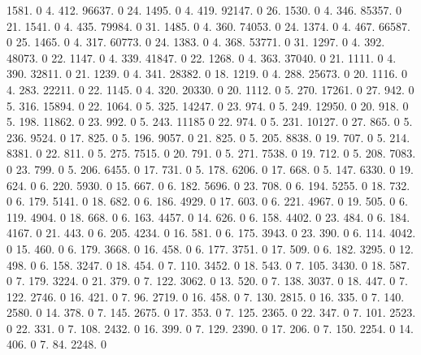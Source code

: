 1581. 0 4. 412. 96637. 0 24. 1495. 0 4. 419. 92147. 0 26. 1530. 0 4. 346. 85357. 0 21. 1541. 0 4. 435. 79984. 0 31. 1485. 0 4. 360. 74053. 0 24. 1374. 0 4. 467. 66587. 0 25. 1465. 0 4. 317. 60773. 0 24. 1383. 0 4. 368. 53771. 0 31. 1297. 0 4. 392. 48073. 0 22. 1147. 0 4. 339. 41847. 0 22. 1268. 0 4. 363. 37040. 0 21. 1111. 0 4. 390. 32811. 0 21. 1239. 0 4. 341. 28382. 0 18. 1219. 0 4. 288. 25673. 0 20. 1116. 0 4. 283. 22211. 0 22. 1145. 0 4. 320. 20330. 0 20. 1112. 0 5. 270. 17261. 0 27. 942. 0 5. 316. 15894. 0 22. 1064. 0 5. 325. 14247. 0 23. 974. 0 5. 249. 12950. 0 20. 918. 0 5. 198. 11862. 0 23. 992. 0 5. 243. 11185 0 22. 974. 0 5. 231. 10127. 0 27. 865. 0 5. 236. 9524. 0 17. 825. 0 5. 196. 9057. 0 21. 825. 0 5. 205. 8838. 0 19. 707. 0 5. 214. 8381. 0 22. 811. 0 5. 275. 7515. 0 20. 791. 0 5. 271. 7538. 0 19. 712. 0 5. 208. 7083. 0 23. 799. 0 5. 206. 6455. 0 17. 731. 0 5. 178. 6206. 0 17. 668. 0 5. 147. 6330. 0 19. 624. 0 6. 220. 5930. 0 15. 667. 0 6. 182. 5696. 0 23. 708. 0 6. 194. 5255. 0 18. 732. 0 6. 179. 5141. 0 18. 682. 0 6. 186. 4929. 0 17. 603. 0 6. 221. 4967. 0 19. 505. 0 6. 119. 4904. 0 18. 668. 0 6. 163. 4457. 0 14. 626. 0 6. 158. 4402. 0 23. 484. 0 6. 184. 4167. 0 21. 443. 0 6. 205. 4234. 0 16. 581. 0 6. 175. 3943. 0 23. 390. 0 6. 114. 4042. 0 15. 460. 0 6. 179. 3668. 0 16. 458. 0 6. 177. 3751. 0 17. 509. 0 6. 182. 3295. 0 12. 498. 0 6. 158. 3247. 0 18. 454. 0 7. 110. 3452. 0 18. 543. 0 7. 105. 3430. 0 18. 587. 0 7. 179. 3224. 0 21. 379. 0 7. 122. 3062. 0 13. 520. 0 7. 138. 3037. 0 18. 447. 0 7. 122. 2746. 0 16. 421. 0 7. 96. 2719. 0 16. 458. 0 7. 130. 2815. 0 16. 335. 0 7. 140. 2580. 0 14. 378. 0 7. 145. 2675. 0 17. 353. 0 7. 125. 2365. 0 22. 347. 0 7. 101. 2523. 0 22. 331. 0 7. 108. 2432. 0 16. 399. 0 7. 129. 2390. 0 17. 206. 0 7. 150. 2254. 0 14. 406. 0 7. 84. 2248. 0 